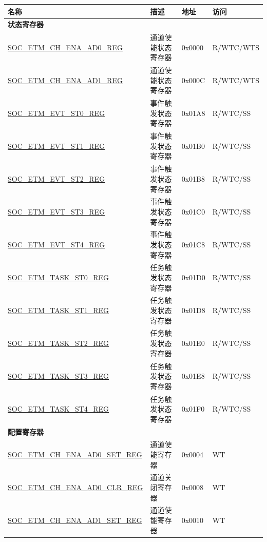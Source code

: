 \begin{longtable}{ | p{6cm} | p{6.2cm} | p{1.3cm} | p{2cm} | }
\hline\rowcolor{lightgray}
\textbf{名称} & \textbf{描述} &  \textbf{地址} & \textbf{访问} \\ \hline
\endhead
\multicolumn{4}{|l|}{\textbf{状态寄存器}} \\ \hline
\hyperref[regdesc:SOCETMCHENAAD0REG]{SOC\_ETM\_CH\_ENA\_AD0\_REG} & 通道使能状态寄存器 & 0x0000 & R/WTC/WTS \\ \hline
\hyperref[regdesc:SOCETMCHENAAD1REG]{SOC\_ETM\_CH\_ENA\_AD1\_REG} & 通道使能状态寄存器 & 0x000C & R/WTC/WTS \\ \hline
\hyperref[regdesc:SOCETMEVTST0REG]{SOC\_ETM\_EVT\_ST0\_REG} & 事件触发状态寄存器 & 0x01A8 & R/WTC/SS \\ \hline
\hyperref[regdesc:SOCETMEVTST1REG]{SOC\_ETM\_EVT\_ST1\_REG} & 事件触发状态寄存器 & 0x01B0 & R/WTC/SS \\ \hline
\hyperref[regdesc:SOCETMEVTST2REG]{SOC\_ETM\_EVT\_ST2\_REG} & 事件触发状态寄存器 & 0x01B8 & R/WTC/SS \\ \hline
\hyperref[regdesc:SOCETMEVTST3REG]{SOC\_ETM\_EVT\_ST3\_REG} & 事件触发状态寄存器 & 0x01C0 & R/WTC/SS \\ \hline
\hyperref[regdesc:SOCETMEVTST4REG]{SOC\_ETM\_EVT\_ST4\_REG} & 事件触发状态寄存器 & 0x01C8 & R/WTC/SS \\ \hline
\hyperref[regdesc:SOCETMTASKST0REG]{SOC\_ETM\_TASK\_ST0\_REG} & 任务触发状态寄存器 & 0x01D0 & R/WTC/SS \\ \hline
\hyperref[regdesc:SOCETMTASKST1REG]{SOC\_ETM\_TASK\_ST1\_REG} & 任务触发状态寄存器 & 0x01D8 & R/WTC/SS \\ \hline
\hyperref[regdesc:SOCETMTASKST2REG]{SOC\_ETM\_TASK\_ST2\_REG} & 任务触发状态寄存器 & 0x01E0 & R/WTC/SS \\ \hline
\hyperref[regdesc:SOCETMTASKST3REG]{SOC\_ETM\_TASK\_ST3\_REG} & 任务触发状态寄存器 & 0x01E8 & R/WTC/SS \\ \hline
\hyperref[regdesc:SOCETMTASKST4REG]{SOC\_ETM\_TASK\_ST4\_REG} & 任务触发状态寄存器 & 0x01F0 & R/WTC/SS \\ \hline
\multicolumn{4}{|l|}{\textbf{配置寄存器}} \\ \hline
\hyperref[regdesc:SOCETMCHENAAD0SETREG]{SOC\_ETM\_CH\_ENA\_AD0\_SET\_REG} & 通道使能寄存器 & 0x0004 & WT \\ \hline
\hyperref[regdesc:SOCETMCHENAAD0CLRREG]{SOC\_ETM\_CH\_ENA\_AD0\_CLR\_REG} & 通道关闭寄存器 & 0x0008 & WT \\ \hline
\hyperref[regdesc:SOCETMCHENAAD1SETREG]{SOC\_ETM\_CH\_ENA\_AD1\_SET\_REG} & 通道使能寄存器 & 0x0010 & WT \\ \hline

\end{longtable}
